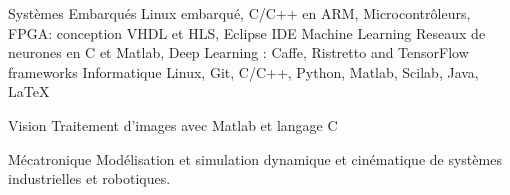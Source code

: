 





\begin{cvskills}
	

\cvskill
{Systèmes Embarqués} %
{Linux embarqué, C/C++ en ARM, Microcontrôleurs, FPGA: conception VHDL et HLS, Eclipse IDE} %
\cvskill
{Machine Learning} %
{Reseaux de neurones en C et Matlab, Deep Learning : Caffe, Ristretto and TensorFlow frameworks} %
\cvskill
{Informatique} %
{Linux, Git, C/C++, Python, Matlab, Scilab, Java, LaTeX} %

\cvskill
{Vision} %
{Traitement d'images avec Matlab et langage C} %


\cvskill
{Mécatronique} %
{Modélisation et simulation dynamique et cinématique de systèmes industrielles et robotiques.} %
\end{cvskills}
